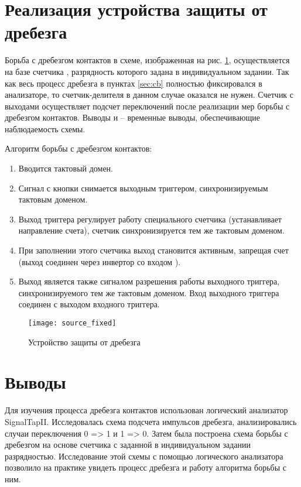\section{Реализация устройства защиты от дребезга}

Борьба с дребезгом контактов в схеме, изображенная на рис. \ref{fig:source_fixed}, осуществляется на базе счетчика , разрядность которого задана в индивидуальном задании. Так как весь процесс дребезга в пунктах \ref{sec:cb} полностью фиксировался в анализаторе, то счетчик-делителя в данном случае оказался не нужен. Счетчик с выходами  осуществляет подсчет переключений  после реализации мер борьбы с дребезгом контактов. Выводы  и  -- временные выводы, обеспечивающие наблюдаемость схемы.

Алгоритм борьбы с дребезгом контактов:
\begin{enumerate}
	\vspace{-0.5em}
	\item Вводится тактовый домен.
	\item Сигнал с кнопки снимается выходным триггером, синхронизируемым тактовым доменом.
	\item Выход триггера регулирует работу специального счетчика (устанавливает направление счета), счетчик синхронизируется тем же тактовым доменом.
	\item При заполнении этого счетчика выход  становится активным, запрещая счет (выход  соединен через инвертор со входом ).
	\item Выход  является также сигналом разрешения работы выходного триггера, синхронизируемого тем же тактовым доменом. Вход  выходного триггера соединен с выходом  входного триггера.
\end{enumerate}

\begin{figure}[H]
	\begin{center}
		\texttt{[image: source\_fixed]}
		\caption{Устройство защиты от дребезга}
		\label{fig:source_fixed}
	\end{center}
\end{figure}

\section{Выводы}

Для изучения процесса дребезга контактов использован логический анализатор SignalTapII. Исследовалась схема подсчета импульсов дребезга, анализировались случаи переключения 0 => 1 и 1 => 0. Затем была построена схема борьбы с дребезгом на основе счетчика с заданной в индивидуальном задании разрядностью. Исследование этой схемы с помощью логического анализатора позволило на практике увидеть процесс дребезга и работу алгоритма борьбы с ним.

